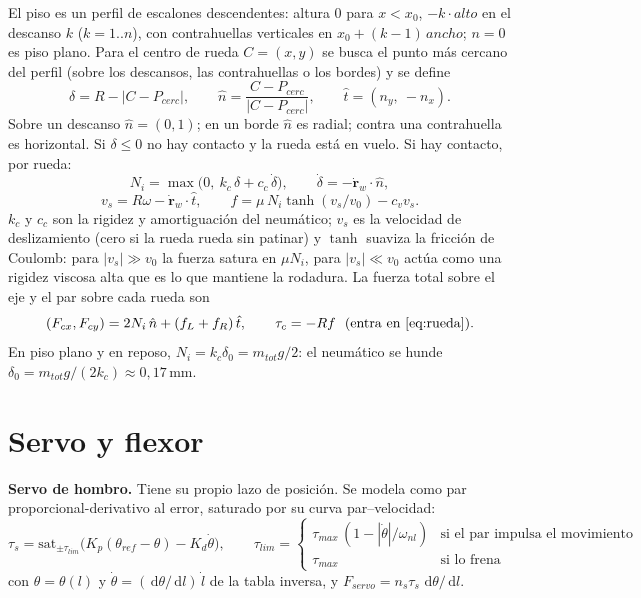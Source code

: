 \documentclass[11pt,a4paper]{article}
\newcommand{\dd}{\,\mathrm{d}}
\begin{document}
El piso es un perfil de escalones descendentes: altura 0 para $x < x_0$, $-k\cdot alto$ en el descanso $k$
($k = 1..n$), con contrahuellas verticales en $x_0 + (k-1)\,ancho$; $n = 0$ es piso plano. Para el centro
de rueda $C = (x, y)$ se busca el punto más cercano del perfil (sobre los descansos, las contrahuellas o los
bordes) y se define
\begin{equation}
  \delta = R - |C - P_{cerc}|, \qquad \hat n = \frac{C - P_{cerc}}{|C - P_{cerc}|}, \qquad \hat t = (n_y,\ -n_x).
\end{equation}
Sobre un descanso $\hat n = (0,1)$; en un borde $\hat n$ es radial; contra una contrahuella es horizontal.
Si $\delta \le 0$ no hay contacto y la rueda está en vuelo. Si hay contacto, por rueda:
\begin{equation}
  N_i = \max\big(0,\ k_c\,\delta + c_c\,\dot\delta\big),\qquad \dot\delta = -\dot{\bm r}_w\cdot\hat n,
  \label{eq:N}
\end{equation}
\begin{equation}
  v_s = R\omega - \dot{\bm r}_w\cdot\hat t,\qquad f = \mu\,N_i\tanh(v_s/v_0) - c_v v_s .
  \label{eq:f}
\end{equation}
$k_c$ y $c_c$ son la rigidez y amortiguación del neumático; $v_s$ es la velocidad de deslizamiento (cero
si la rueda rueda sin patinar) y $\tanh$ suaviza la fricción de Coulomb: para $|v_s| \gg v_0$ la fuerza
satura en $\mu N_i$, para $|v_s| \ll v_0$ actúa como una rigidez viscosa alta que es lo que mantiene la
rodadura. La fuerza total sobre el eje y el par sobre cada rueda son
\begin{equation}
  (F_{cx}, F_{cy}) = 2N_i\,\hat n + (f_L + f_R)\,\hat t, \qquad \tau_{c} = -R f \ \ (\text{entra en \eqref{eq:rueda}}).
\end{equation}
En piso plano y en reposo, $N_i = k_c\delta_0 = m_{tot}g/2$: el neumático se hunde
$\delta_0 = m_{tot}g/(2k_c) \approx 0{,}17$\,mm.

\section{Servo y flexor}
\label{sec:flexor}

\textbf{Servo de hombro.} Tiene su propio lazo de posición. Se modela como par proporcional-derivativo al
error, saturado por su curva par--velocidad:
\begin{equation}
  \tau_s = \mathrm{sat}_{\pm\tau_{lim}}\big(K_p(\theta_{ref} - \theta) - K_d\dot\theta\big),\qquad
  \tau_{lim} = \begin{cases}\tau_{max}\,(1 - |\dot\theta|/\omega_{nl}) & \text{si el par impulsa el movimiento}\\ \tau_{max} & \text{si lo frena}\end{cases}
\end{equation}
con $\theta = \theta(l)$ y $\dot\theta = (\dd\theta/\dd l)\,\dot l$ de la tabla inversa, y
$F_{servo} = n_s\tau_s\,\dd\theta/\dd l$.
\end{document}

